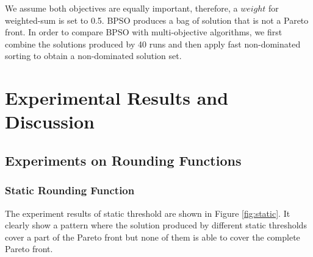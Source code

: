 We assume both objectives are equally important, therefore, a $weight$ for weighted-sum is set to 0.5. 
BPSO produces a bag of solution that is not a Pareto front. In order to compare BPSO with multi-objective algorithms, we first combine the solutions produced by 40 runs and then apply
fast non-dominated sorting to obtain a non-dominated solution set.




\section{Experimental Results and Discussion}
\subsection{Experiments on Rounding Functions}
\subsubsection{Static Rounding Function}

The experiment results of static threshold are shown in Figure \ref{fig:static}. It clearly show a pattern where the solution produced by different static thresholds
cover a part of the Pareto front but none of them is able to cover the complete Pareto front.

